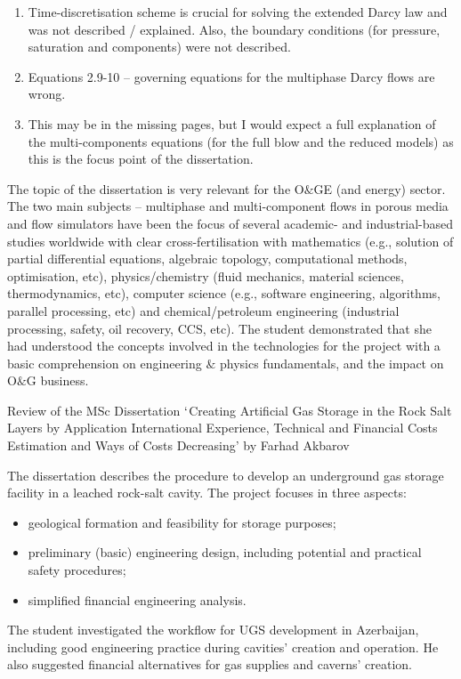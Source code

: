 \documentclass[14pt,twoside]{report}
\begin{document}
\begin{enumerate}
%
\item Time-discretisation scheme is crucial for solving the extended Darcy law and was not described / explained. Also, the boundary conditions (for pressure, saturation and components) were not described.
%
\item Equations 2.9-10 -- governing equations for the multiphase Darcy flows are wrong.
%
\item This may be in the missing pages, but I would expect a full explanation of the multi-components equations (for the full blow and the reduced models) as this is the focus point of the dissertation.  
%
\end{enumerate}

The topic of the dissertation is very relevant for the O$\&$GE (and energy) sector. The two main subjects -- multiphase and multi-component flows in porous media and flow simulators have been the focus of several academic- and industrial-based studies worldwide with clear cross-fertilisation with mathematics (e.g., solution of partial differential equations, algebraic topology, computational methods, optimisation, etc), physics/chemistry (fluid mechanics, material sciences, thermodynamics, etc), computer science (e.g., software engineering, algorithms, parallel processing, etc) and chemical/petroleum engineering (industrial processing, safety, oil recovery, CCS,  etc). The student demonstrated that she had understood the concepts involved in the technologies for the project with a basic comprehension on engineering $\&$ physics fundamentals, and the impact on O$\&$G business.    




\clearpage


\medskip

\begin{center}
{\Large Review of the MSc Dissertation $\lq$Creating Artificial Gas Storage in the Rock Salt Layers by Application International Experience, Technical and Financial Costs Estimation and Ways of Costs Decreasing' by Farhad Akbarov}
\end{center}

\medskip

The dissertation describes the procedure to develop an underground gas storage facility in a leached rock-salt cavity. The project focuses in three aspects:
\begin{itemize}
\item geological formation and feasibility for storage purposes;
\item preliminary (basic) engineering design, including potential and practical safety procedures;
\item simplified financial engineering analysis.
\end{itemize} 
The student investigated the workflow for UGS development in Azerbaijan, including good engineering practice during cavities' creation and operation. He also suggested financial alternatives for gas supplies and caverns' creation.
\end{document}
